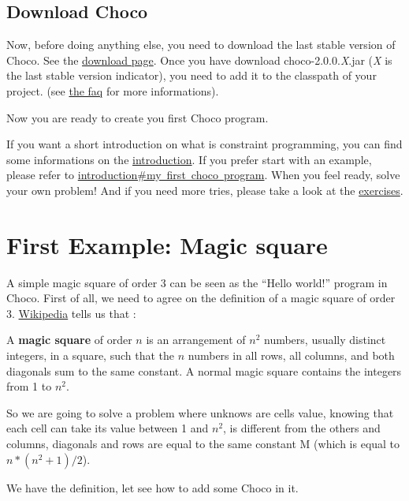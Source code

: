 \section{Download Choco}\label{gettingstarted:downloadchoco}\hypertarget{gettingstarted:downloadchoco}{}
Now, before doing anything else, you need to download the last stable version of Choco. See the \href{http://choco.emn.fr}{download page}. 
Once you have download choco-2.0.0.\emph{X}.jar (\emph{X} is the last stable version indicator), you need to add it to the classpath of your project. (see \hyperlink{faq:howtoaddthechocolibrarytomyproject}{the faq} for more informations).

Now you are ready to create you first Choco program.

If you want a short introduction on what is constraint programming, you can find some informations on the \hyperlink{doc:introduction}{introduction}. If you prefer start with an example, please refer to \hyperlink{introduction:myfirstchocoprogram}{introduction\#my\ first\ choco\ program}.
When you feel ready, solve your own problem! And if you need more tries, please take a look at the \hyperlink{exercises}{exercises}. %

\chapter{First Example: Magic square}\label{gettingstarted:firstexample:magicsquare}\hypertarget{gettingstarted:firstexample:magicsquare}{}
A simple magic square of order 3 can be seen as the ``Hello world!'' program in Choco. First of all, we need to agree on the definition of a magic square of order 3.
\href{http://en.wikipedia.org/wiki/Magic_square}{Wikipedia} tells us that :
\begin{myquote}
A \textbf{magic square} of order $n$ is an arrangement of $n^2$ numbers, usually distinct integers, in a square, such that the $n$ numbers in all rows, all columns, and both diagonals sum to the same constant. A normal magic square contains the integers from 1 to $n^2$.
\end{myquote}

So we are going to solve a problem where unknows are cells value, knowing that each cell can take its value between 1 and $n^2$, is different from the others and columns, diagonals and rows are equal to the same constant M (which is equal to $n * (n^2 + 1) / 2$).

We have the definition, let see how to add some Choco in it.

